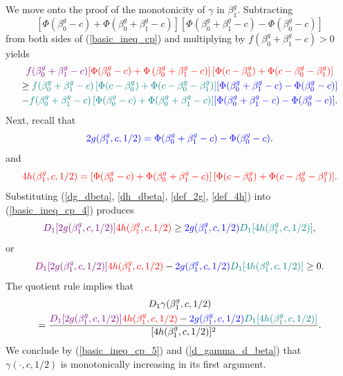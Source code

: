 \documentclass[12pt]{article}
\begin{document}
We move onto the proof of the monotonicity of $\gamma$ in $\beta^g_1$. Subtracting $$\left[\Phi(\beta_0^g - c) + \Phi(\beta^g_0 + \beta^g_1 - c) \right]\left[\Phi(\beta_0^g + \beta_1^g - c) - \Phi(\beta_0^g - c)\right]$$ from both sides of (\ref{basic_ineq_cp}) and multiplying by $f(\beta^g_0 + \beta^g_1 - c) > 0$ yields
\begin{multline}\label{basic_ineq_cp_4}
\textcolor{violet}{f(\beta^g_0 + \beta^g_1 - c)} \textcolor{red}{ \left[\Phi(\beta^g_0 - c) + \Phi\left(\beta^g_0 + \beta^g_1 - c \right) \right] \left[ \Phi(c - \beta^g_0) + \Phi(c - \beta^g_0 - \beta^g_1) \right]}  \\ \geq \textcolor{teal}{f(\beta^g_0 + \beta^g_1 - c) \left[\Phi(c - \beta^g_0) + \Phi(c - \beta_0^g - \beta_1^g)\right]}\textcolor{blue}{\left[\Phi(\beta_0^g + \beta_1^g - c) - \Phi(\beta_0^g - c)\right]} \\ -\textcolor{teal}{f(\beta^g_0 + \beta^g_1 - c)   \left[\Phi(\beta_0^g - c) + \Phi(\beta^g_0 + \beta^g_1 - c) \right]} \textcolor{blue}{\left[\Phi(\beta_0^g + \beta_1^g - c) - \Phi(\beta_0^g - c)\right]}.
\end{multline}
Next, recall that
\begin{equation}\label{def_2g}
\textcolor{blue}{2g(\beta^g_1,c,1/2) = \Phi(\beta^g_0 + \beta^g_1 - c) - \Phi(\beta^g_0 - c)}.
\end{equation}
and
\begin{equation}\label{def_4h}
\textcolor{red}{4h(\beta^g_1, c, 1/2) = \left[ \Phi(\beta^g_0 - c) + \Phi(\beta^g_0 + \beta^g_1 - c) \right] \left[\Phi(c - \beta^g_0) + \Phi( c - \beta^g_0 - \beta^g_1) \right]}.
\end{equation}
Substituting (\ref{dg_dbeta}, \ref{dh_dbeta}, \ref{def_2g}, \ref{def_4h}) into (\ref{basic_ineq_cp_4}) produces
\begin{equation*}
\textcolor{violet}{D_1[2g(\beta^g_1, c, 1/2)]}\textcolor{red}{4h(\beta^g_1, c, 1/2)} \geq \textcolor{blue}{2g(\beta^g_1, c, 1/2)}\textcolor{teal}{D_1[4h(\beta^g_1, c, 1/2)]},
\end{equation*}
or 
\begin{equation}\label{basic_ineq_cp_5}
\textcolor{violet}{D_1[2g(\beta^g_1, c, 1/2)]}\textcolor{red}{4h(\beta^g_1, c, 1/2)} - \textcolor{blue}{2g(\beta^g_1, c, 1/2)}\textcolor{teal}{D_1[4h(\beta^g_1, c, 1/2)]} \geq 0.
\end{equation}
The quotient rule implies that
\begin{multline}\label{d_gamma_d_beta}
D_1 \gamma(\beta^g_1, c, 1/2) \\ = \frac{ \textcolor{violet}{D_1[2g(\beta^g_1, c, 1/2)]}\textcolor{red}{4h(\beta^g_1, c, 1/2)} - \textcolor{blue}{2g(\beta^g_1, c, 1/2)}\textcolor{teal}{D_1[4h(\beta^g_1, c, 1/2)]} }{[4h(\beta^g_1, c, 1/2)]^2}.
\end{multline}
We conclude by (\ref{basic_ineq_cp_5}) and (\ref{d_gamma_d_beta}) that $\gamma(\cdot, c, 1/2)$ is monotonically increasing in its first argument.
\end{document}
